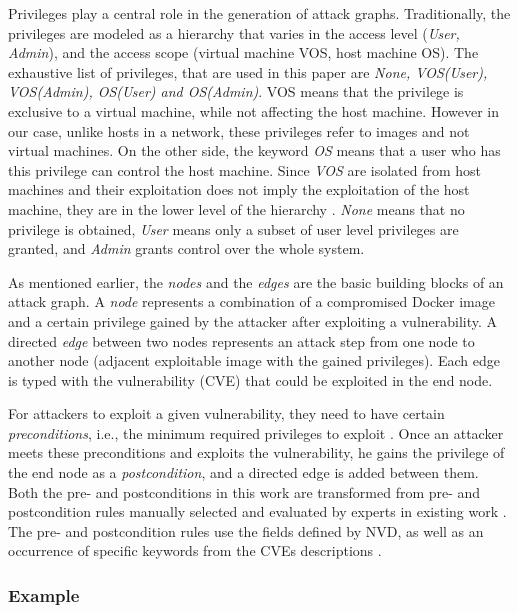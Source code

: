 Privileges play a central role in the generation of attack graphs. Traditionally, the privileges are modeled as a hierarchy that varies in the access level (\textit{User, Admin}), and the access scope (virtual machine VOS, host machine OS). The exhaustive list of privileges, that are used in this paper are \textit{None, VOS(User), VOS(Admin), OS(User) and OS(Admin)}. VOS means that the privilege is exclusive to a virtual machine, while not affecting the host machine. However in our case, unlike hosts in a network, these privileges refer to images and not virtual machines. On the other side, the keyword \textit{OS} means that a user who has this privilege  can control the  host machine. Since \textit{VOS} are isolated from host machines and their exploitation does not imply the exploitation of the host machine, they are in the lower level of the hierarchy \cite{aksu2018automated}. \textit{None} means that no privilege is obtained, \textit{User} means only a subset of user level privileges are granted, and \textit{Admin} grants control over the whole system.

As mentioned earlier, the \textit{nodes} and the \textit{edges} are the basic building blocks of an attack graph. A \textit{node} represents  a combination of a compromised Docker image and a certain privilege gained by the attacker after exploiting a vulnerability. A directed \textit{edge} between two nodes represents an attack step from one node  to another node (adjacent exploitable image with the gained privileges). Each edge is typed with the vulnerability (CVE) that could be exploited in the end node.

For attackers to exploit a given vulnerability, they need to have certain \textit{preconditions}, i.e., the minimum required privileges to exploit \cite{aksu2018automated}. Once an attacker meets these preconditions and exploits the vulnerability, he gains the privilege of the end node as a \textit{postcondition}, and a directed edge is added between them. Both the pre- and postconditions in this work are transformed from pre- and postcondition rules manually selected and evaluated by experts in existing work \cite{aksu2018automated}. The pre- and postcondition rules use the fields defined by NVD, as well as an occurrence of specific keywords from the CVEs descriptions \cite{booth2013national}.

\subsubsection{Example}

